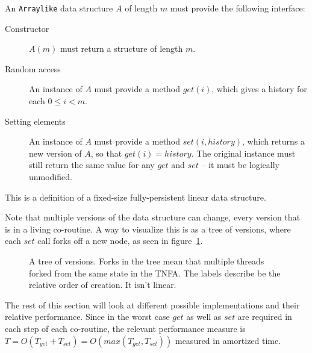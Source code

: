 \documentclass[11pt]{Thesis}
\theoremstyle{definition}
\newcommand{\Figref}[1]{figure~\ref{fig:#1}}
\newcommand{\figlabel}[1]{\label{fig:#1}}
\begin{document}
\begin{definition}
  An \texttt{Arraylike} data structure $A$ of length $m$ must provide the 
  following interface:
  \begin{description}
    \item[Constructor] $A(m)$ must return a structure of length $m$.
    \item[Random access] An instance of $A$ must provide a method $get(i)$,
      which gives a history for each $0 \leq i < m$.
    \item[Setting elements] An instance of $A$ must provide a method $set(i,
      history)$, which returns a new version of $A$, so that $get(i) = history$.
      The original instance must still return the same value for any $get$ 
      and $set$ -- it must be logically unmodified.
  \end{description}

  This is a definition of a fixed-size fully-persistent linear data structure.
\end{definition}

Note that multiple versions of the data structure can change, every version 
that is in a living co-routine. A way to visualize this is as a tree of 
versions, where each $set$ call forks off a new node, as seen in
\Figref{version-tree}.

\begin{figure}[htpb]
  \centering
  \caption{A tree of versions. Forks in the tree mean that multiple threads 
  forked from the same state in the TNFA. The labels describe be the relative 
order of creation. It isn't linear.}
  \figlabel{version-tree}
\end{figure}

The rest of this section will look at different possible implementations and 
their relative performance. Since in the worst case $get$ as well as $set$ are
required in each step of each co-routine, the relevant performance measure is 
$T=O(T_{get} + T_{set}) = O(max(T_{get}, T_{set}))$ measured in amortized time.
\end{document}
